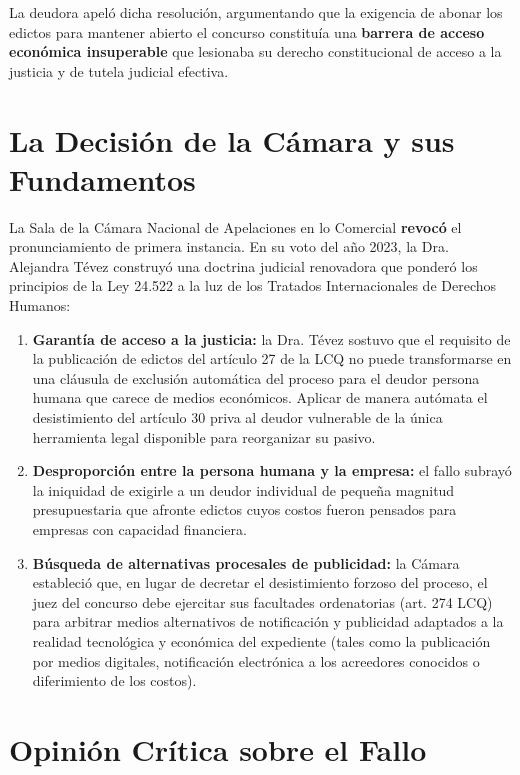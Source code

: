 \documentclass[12pt,oneside]{book}
\begin{document}
La deudora apeló dicha resolución, argumentando que la exigencia de abonar los edictos para mantener abierto el concurso constituía una \textbf{barrera de acceso económica insuperable} que lesionaba su derecho constitucional de acceso a la justicia y de tutela judicial efectiva.

\section{La Decisión de la Cámara y sus Fundamentos}

La Sala de la Cámara Nacional de Apelaciones en lo Comercial \textbf{revocó} el pronunciamiento de primera instancia. En su voto del año 2023, la Dra. Alejandra Tévez construyó una doctrina judicial renovadora que ponderó los principios de la Ley 24.522 a la luz de los Tratados Internacionales de Derechos Humanos:

\begin{enumerate}
    \item \textbf{Garantía de acceso a la justicia:} la Dra. Tévez sostuvo que el requisito de la publicación de edictos del artículo 27 de la LCQ no puede transformarse en una cláusula de exclusión automática del proceso para el deudor persona humana que carece de medios económicos. Aplicar de manera autómata el desistimiento del artículo 30 priva al deudor vulnerable de la única herramienta legal disponible para reorganizar su pasivo.

    \item \textbf{Desproporción entre la persona humana y la empresa:} el fallo subrayó la iniquidad de exigirle a un deudor individual de pequeña magnitud presupuestaria que afronte edictos cuyos costos fueron pensados para empresas con capacidad financiera.

    \item \textbf{Búsqueda de alternativas procesales de publicidad:} la Cámara estableció que, en lugar de decretar el desistimiento forzoso del proceso, el juez del concurso debe ejercitar sus facultades ordenatorias (art. 274 LCQ) para arbitrar medios alternativos de notificación y publicidad adaptados a la realidad tecnológica y económica del expediente (tales como la publicación por medios digitales, notificación electrónica a los acreedores conocidos o diferimiento de los costos).
\end{enumerate}

\section{Opinión Crítica sobre el Fallo}
\end{document}
